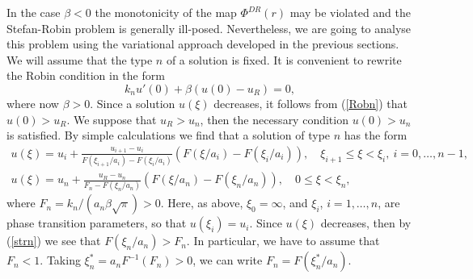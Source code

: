 \documentclass[10pt,a4paper]{amsart}
\numberwithin{equation}{section}
\begin{document}
In the case $\beta<0$ the monotonicity of the map $\Phi^{DR}(r)$ may be violated and the Stefan-Robin problem is generally ill-posed. Nevertheless, we are going to analyse this problem using the variational approach developed in the previous sections. We will assume that the type $n$ of a solution is fixed. It is convenient to rewrite the Robin condition in the form
\begin{equation}\label{Robn}
k_n u'(0)+\beta(u(0)-u_R)=0,
\end{equation}
where now $\beta>0$. Since a solution $u(\xi)$ decreases, it follows from (\ref{Robn}) that $u(0)>u_R$. We suppose that $u_R>u_n$, then the necessary condition $u(0)>u_n$ is satisfied. By simple calculations we find that a solution of type $n$ has the form
\begin{align}\label{stri}
u(\xi)=u_i+\frac{u_{i+1}-u_i}{F(\xi_{i+1}/a_i)-F(\xi_i/a_i)}(F(\xi/a_i)-F(\xi_i/a_i)), \quad
\xi_{i+1}\le\xi<\xi_i, \ i=0,\ldots,n-1, \\
\label{strn}
u(\xi)=u_n+\frac{u_R-u_n}{F_n-F(\xi_n/a_n)}(F(\xi/a_n)-F(\xi_n/a_n)), \quad 0\le\xi<\xi_n,
\end{align}
where $F_n=k_n/(a_n\beta\sqrt{\pi})>0$. Here, as above, $\xi_0=\infty$, and $\xi_i$, $i=1,\ldots,n$, are phase transition parameters, so that $u(\xi_i)=u_i$. Since $u(\xi)$ decreases, then by (\ref{strn}) we see that $F(\xi_n/a_n)>F_n$. In particular, we have to assume that $F_n<1$. Taking $\xi^*_n=a_nF^{-1}(F_n)>0$, we can write $F_n=F(\xi^*_n/a_n)$.
\end{document}
